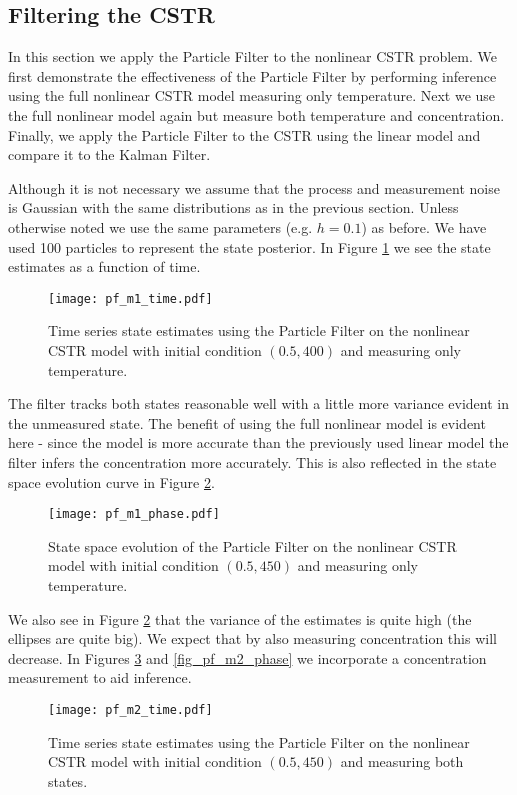 \subsection{Filtering the CSTR}
In this section we apply the Particle Filter to the nonlinear CSTR problem. We first demonstrate the effectiveness of the Particle Filter by performing inference using the full nonlinear CSTR model measuring only temperature. Next we use the full nonlinear model again but measure both temperature and concentration. Finally, we apply the Particle Filter to the CSTR using the linear model and compare it to the Kalman Filter.

Although it is not necessary we assume that the process and measurement noise is Gaussian with the same distributions as in the previous section. Unless otherwise noted we use the same parameters (e.g. $h=0.1$) as before. We have used 100 particles to represent the state posterior. In Figure \ref{fig_pf_m1_time} we see the state estimates as a function of time.
\begin{figure}[H] 
\centering
\texttt{[image: pf\_m1\_time.pdf]}
\caption{Time series state estimates using the Particle Filter on the nonlinear CSTR model with initial condition $(0.5, 400)$ and measuring only temperature.}
\label{fig_pf_m1_time}
\end{figure}
The filter tracks both states reasonable well with a little more variance evident in the unmeasured state. The benefit of using the full nonlinear model is evident here - since the model is more accurate than the previously used linear model the filter infers the concentration more accurately. This is also reflected in the state space evolution curve in Figure \ref{fig_pf_m1_phase}.
\begin{figure}[H] 
\centering
\texttt{[image: pf\_m1\_phase.pdf]}
\caption{State space evolution of the Particle Filter on the nonlinear CSTR model with initial condition $(0.5, 450)$ and measuring only temperature.}
\label{fig_pf_m1_phase}
\end{figure}
We also see in Figure \ref{fig_pf_m1_phase} that the variance of the estimates is quite high (the ellipses are quite big). We expect that by also measuring concentration this will decrease. In Figures \ref{fig_pf_m2_time} and \ref{fig_pf_m2_phase} we incorporate a concentration measurement to aid inference. 
\begin{figure}[H] 
\centering
\texttt{[image: pf\_m2\_time.pdf]}
\caption{Time series state estimates using the Particle Filter on the nonlinear CSTR model with initial condition $(0.5, 450)$ and measuring both states.}
\label{fig_pf_m2_time}
\end{figure}

